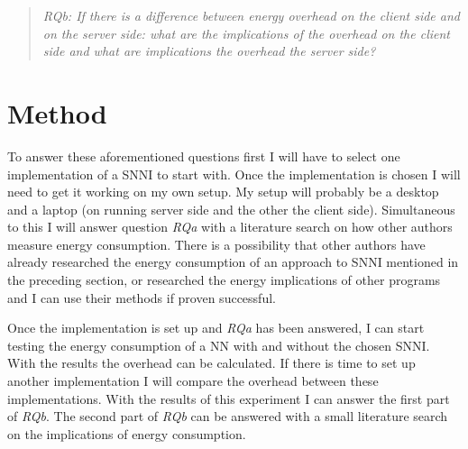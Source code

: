 \documentclass[../thesis.tex]{subfiles}
\begin{document}
\begin{quote} \emph{RQb: If there is a difference between energy overhead on the client side and on the server side: what are the implications of the overhead on the client side and what are implications the overhead the server side?} \end{quote}

\section{Method}
To answer these aforementioned questions first I will have to select one implementation of a SNNI to start with. Once the implementation is chosen I will need to get it working on my own setup. My setup will probably be a desktop and a laptop (on running server side and the other the client side). Simultaneous to this I will answer question \textit{RQa} with a literature search on how other authors measure energy consumption. There is a possibility that other authors have already researched the energy consumption of an approach to SNNI mentioned in the preceding section, or researched the energy implications of other programs and I can use their methods if proven successful.

Once the implementation is set up and \textit{RQa} has been answered, I can start testing the energy consumption of a NN with and without the chosen SNNI. With the results the overhead can be calculated. If there is time to set up another implementation I will compare the overhead between these implementations. With the results of this experiment I can answer the first part of \textit{RQb}. The second part of \textit{RQb} can be answered with a small literature search on the implications of energy consumption. 
\end{document}
